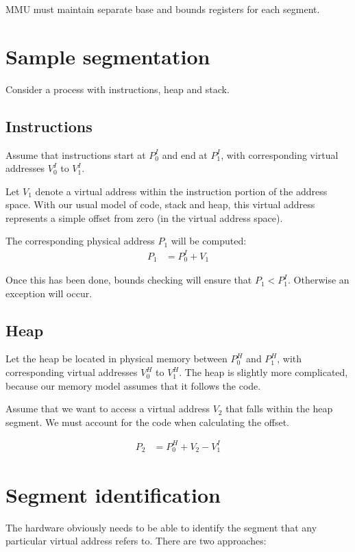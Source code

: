 MMU must maintain separate base and bounds registers for each segment.


\section{Sample segmentation}

Consider a process with instructions, heap and stack.

\subsection{Instructions}

Assume that instructions start at $P^I_0$ and end at $P^I_1$, with corresponding virtual addresses $V^I_0$ to $V^I_1$.

Let $V_1$ denote a virtual address within the instruction portion of the address space.
With our usual model of code, stack and heap, this virtual address represents a simple offset from zero (in the virtual address space).

The corresponding physical address $P_1$ will be computed:
\begin{align}
  P_1 & = P^I_0 + V_1
\end{align}

Once this has been done, bounds checking will ensure that $P_1<P^I_1$.
Otherwise an exception will occur.

\subsection{Heap}

Let the heap be located in physical memory between $P^H_0$ and $P^H_1$, with corresponding virtual addresses $V^H_0$ to $V^H_1$.
The heap is slightly more complicated, because our memory model assumes that it follows the code.

Assume that we want to access a virtual address $V_2$ that falls within the heap segment.
We must account for the code when calculating the offset.

\begin{align}
  P_2 & = P^H_0 + V_2 - V^I_1
\end{align}


\section{Segment identification}

The hardware obviously needs to be able to identify the segment that any particular virtual address refers to.
There are two approaches:

